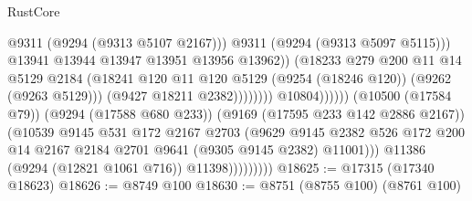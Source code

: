 \begin{lexlean}{RustCore}
\begin{coremodule}
                                                        @9311
                                                        (@9294 (@9313 @5107 @2167)))
                                                      @9311
                                                      (@9294 (@9313 @5097 @5115)))
                                                    @13941
                                                    @13944
                                                    @13947
                                                    @13951
                                                    @13956
                                                    @13962))
                                                (@18233
                                                  @279
                                                  @200
                                                  @11
                                                  @14
                                                  @5129
                                                  @2184
                                                  (@18241
                                                    @120
                                                    @11
                                                    @120
                                                    @5129
                                                    (@9254 (@18246 @120))
                                                    (@9262 (@9263 @5129)))
                                                  (@9427 @18211 @2382))))))))
                                    @10804))))))
                        (@10500 (@17584 @79))
                        (@9294 (@17588 @680 @233))
                        (@9169 (@17595 @233 @142 @2886 @2167))
                        (@10539
                          @9145
                          @531
                          @172
                          @2167
                          @2703
                          (@9629
                            @9145
                            @2382
                            @526
                            @172
                            @200
                            @14
                            @2167
                            @2184
                            @2701
                            @9641
                            (@9305 @9145 @2382)
                            @11001)))
                      @11386
                      (@9294 (@12821 @1061 @716))
                      @11398)))))))))
@18625 := @17315 (@17340 @18623)
@18626 := @8749 @100
@18630 := @8751 (@8755 @100) (@8761 @100)

\end{coremodule}
\end{lexlean}
